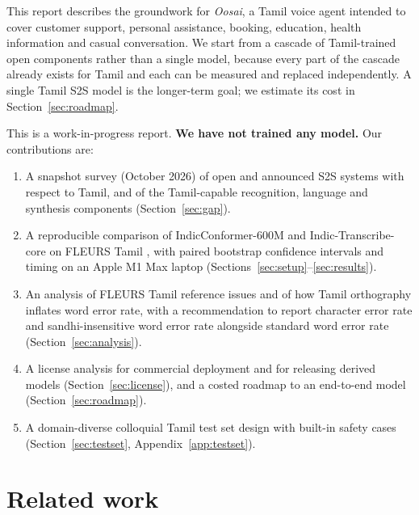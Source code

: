 \documentclass[11pt]{article}
\begin{document}
This report describes the groundwork for \emph{Oosai}, a Tamil voice agent intended to cover customer
support, personal assistance, booking, education, health information and casual conversation. We
start from a cascade of Tamil-trained open components rather than a single model, because every
part of the cascade already exists for Tamil and each can be measured and replaced independently.
A single Tamil S2S model is the longer-term goal; we estimate its cost in Section~\ref{sec:roadmap}.

This is a work-in-progress report. \textbf{We have not trained any model.} Our contributions are:
\begin{enumerate}
  \item A snapshot survey (October 2026) of open and announced S2S systems with respect to Tamil,
        and of the Tamil-capable recognition, language and synthesis components (Section~\ref{sec:gap}).
  \item A reproducible comparison of IndicConformer-600M \citep{ai4bharat2025indicconformer} and
        Indic-Transcribe-core \citep{bodhan2026indictranscribe} on FLEURS Tamil
        \citep{conneau2022fleurs}, with paired bootstrap confidence intervals and timing on an
        Apple M1 Max laptop (Sections~\ref{sec:setup}--\ref{sec:results}).
  \item An analysis of FLEURS Tamil reference issues and of how Tamil orthography inflates word error
        rate, with a recommendation to report character error rate and sandhi-insensitive word
        error rate alongside standard word error rate (Section~\ref{sec:analysis}).
  \item A license analysis for commercial deployment and for releasing derived models
        (Section~\ref{sec:license}), and a costed roadmap to an end-to-end model
        (Section~\ref{sec:roadmap}).
  \item A domain-diverse colloquial Tamil test set design with built-in safety cases
        (Section~\ref{sec:testset}, Appendix~\ref{app:testset}).
\end{enumerate}

\section{Related work}
\end{document}
